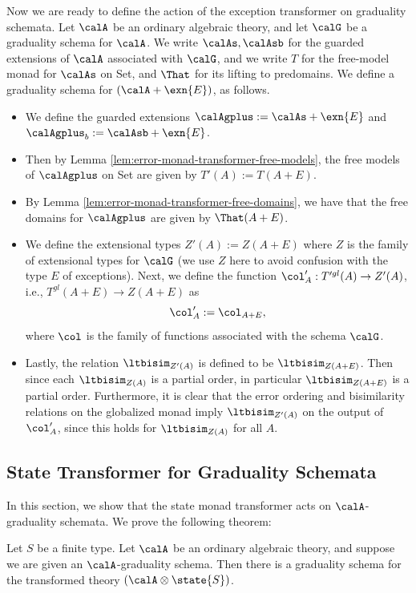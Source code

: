 Now we are ready to define the action of the exception transformer on graduality
schemata. Let $\calA$ be an ordinary algebraic theory, and let $\calG$ be a
graduality schema for $\calA$.
%
We write $\calAs, \calAsb$ for the guarded extensions of $\calA$ associated with
$\calG$, and we write $T$ for the free-model monad for $\calAs$ on Set, and
$\That$ for its lifting to predomains.
%
We define a graduality schema for $(\calA + \exn{E})$, as follows.
\begin{itemize}
    \item We define the guarded extensions 
    $\calAgplus := \calAs + \exn{E}$ and 
    $\calAgplus_b := \calAsb + \exn{E}$.

    \item Then by Lemma \ref{lem:error-monad-transformer-free-models}, the free models of
    $\calAgplus$ on Set are given by $T'(A) := T(A + E)$.

    \item By Lemma \ref{lem:error-monad-transformer-free-domains}, we have that 
    the free domains for $\calAgplus$ are given by $\That(A + E)$.

    \item We define the extensional types $Z'(A) := Z(A + E)$ where $Z$ is the
    family of extensional types for $\calG$ (we use $Z$ here to avoid confusion
    with the type $E$ of exceptions). Next, we define the function
    $\col'_A : T'^{gl}(A) \to Z'(A)$, i.e., $T^{gl}(A + E) \to Z(A + E)$ as 
    \[ \col'_A := \col_{A + E}, \]
    where $\col$ is the family of functions associated with the schema $\calG$.
    
    \item Lastly, the relation $\ltbisim_{Z'(A)}$ is defined to be
    $\ltbisim_{Z(A + E)}$. Then since each $\ltbisim_{Z(A)}$ is a partial order,
    in particular $\ltbisim_{Z(A + E)}$ is a partial order. Furthermore, it is
    clear that the error ordering and bisimilarity relations on the globalized
    monad imply $\ltbisim_{Z'(A)}$ on the output of $\col'_A$, since this holds for
    $\ltbisim_{Z(A)}$ for all $A$.
\end{itemize}



\subsection{State Transformer for Graduality Schemata}

In this section, we show that the state monad transformer acts on
$\calA$-graduality schemata. We prove the following theorem:
\begin{theorem}
  Let $S$ be a finite type. Let $\calA$ be an ordinary algebraic theory, and
  suppose we are given an $\calA$-graduality schema. Then there is a graduality
  schema for the transformed theory $(\calA \otimes \state{S})$.
\end{theorem}

